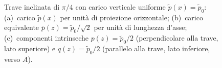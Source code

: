 \begin{figure}[htbp]
			\caption{Trave inclinata di $\pi/4$ con carico
				verticale uniforme $\tilde{p}(x) = \tilde{p}_0$:
				(a)~carico $\tilde{p}(x)$ per unità di
				proiezione orizzontale;
				(b)~carico equivalente $\bar{p}(z) =
				\tilde{p}_0/\sqrt{2}$ per unità di lunghezza d'asse;
				(c)~componenti intrinseche $p(z) = \tilde{p}_0/2$
				(perpendicolare alla trave, lato superiore)
				e $q(z) = \tilde{p}_0/2$ (parallelo alla trave,
				lato inferiore, verso $A$).}
			\label{fig:stat_misto_inclinata_carichi}
		\end{figure}
